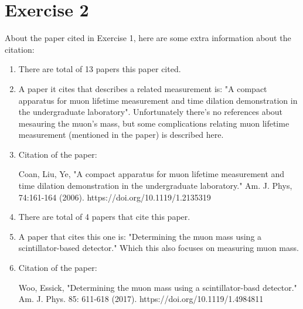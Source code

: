 \documentclass{article}
\begin{document}
\newpage

\section*{Exercise 2}

About the paper cited in Exercise 1, here are some extra information about the citation:
\begin{enumerate}
    \item There are total of 13 papers this paper cited.
    \item A paper it cites that describes a related measurement is: "A compact apparatus for muon lifetime measurement and time dilation demonstration in the undergraduate laboratory". Unfortunately there's no references about mesauring the muon's mass, but some complications relating muon lifetime measurement (mentioned in the paper) is described here.
    \item Citation of the paper:
    
    \hfil

    Coan, Liu, Ye, "A compact apparatus for muon lifetime measurement and time dilation demonstration in the undergraduate laboratory." Am. J. Phys, 74:161-164 (2006). https://doi.org/10.1119/1.2135319 

    \hfil

    \item There are total of 4 papers that cite this paper.
    \item A paper that cites this one is: "Determining the muon mass using a scintillator-based detector." Which this also focuses on measuring muon mass.
    \item Citation of the paper:
    
    \hfil

    Woo, Essick, "Determining the muon mass using a scintillator-basd detector." Am. J. Phys. 85: 611-618 (2017). https://doi.org/10.1119/1.4984811 
\end{enumerate}
\end{document}
